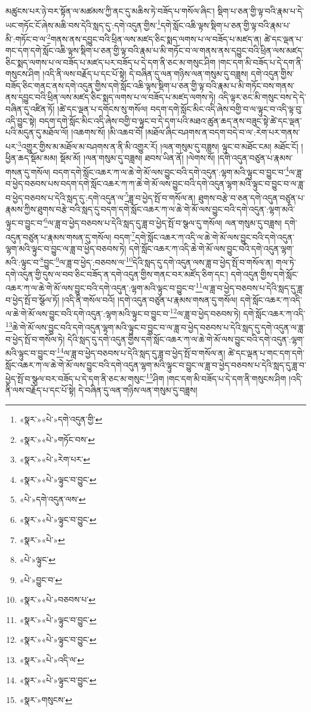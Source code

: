 མཚུངས་པར་ཉེ་བར་སྟོན་ལ་མཚམས་ཀྱི་ནང་དུ་མཆིས་ཏེ་བཟོད་པ་གསོལ་ཞིང་། སྡིག་པ་ཅན་གྱི་ལྟ་བའི་རྣམ་པ་དེ་ཡང་གཏོང་ངོ་ཞེས་མཆི་བས་དེའི་སླད་དུ་:དགེ་འདུན་གྱིས་\footnote{«སྣར་»«པེ་»དགེ་འདུན་གྱི་}དགེ་སློང་འཆི་ལྟས་སྡིག་པ་ཅན་གྱི་ལྟ་བའི་རྣམ་པ་མི་:གཏོང་བ་ལ་\footnote{«སྣར་»«པེ་»གཏོང་བས་}གནས་ནས་དབྱུང་བའི་ཕྲིན་ལས་མཛད་ཅིང་སྨད་ལགས་པ་ལ་བཟོད་པ་མཛད་ན། ཚེ་དང་ལྡན་པ་གང་དག་དགེ་སློང་འཆི་ལྟས་སྡིག་པ་ཅན་གྱི་ལྟ་བའི་རྣམ་པ་མི་གཏོང་བ་ལ་གནས་ནས་དབྱུང་བའི་ཕྲིན་ལས་མཛད་ཅིང་སྨད་ལགས་པ་ལ་བཟོད་པ་མཛད་པར་བཟོད་པ་དེ་དག་ནི་ཅང་མ་གསུང་ཤིག །གང་དག་མི་བཟོད་པ་དེ་དག་ནི་གསུངས་ཤིག །འདི་ནི་ལས་བརྗོད་པ་དང་པོ་སྟེ། དེ་བཞིན་དུ་ལན་གཉིས་ལན་གསུམ་དུ་བཟླས། དགེ་འདུན་གྱིས་བཟོད་ཅིང་གནང་ནས་དགེ་འདུན་གྱིས་དགེ་སློང་འཆི་ལྟས་སྡིག་པ་ཅན་གྱི་ལྟ་བའི་རྣམ་པ་མི་གཏོང་བས་གནས་ནས་དབྱུང་བའི་ཕྲིན་ལས་མཛད་ཅིང་སྨད་ལགས་པ་ལ་བཟོད་པ་མཛད་ལགས་ཏེ། འདི་ལྟར་ཅང་མི་གསུང་བས་དེ་དེ་བཞིན་དུ་འཛིན་ཏོ། །ཚེ་དང་ལྡན་པ་དགོངས་སུ་གསོལ། བདག་དགེ་སློང་མིང་འདི་ཞེས་བགྱི་བ་ལ་ལྟུང་བ་འདི་ལྟ་བུ་འདི་བྱུང་སྟེ། བདག་དགེ་སློང་མིང་འདི་ཞེས་བགྱི་བ་ལྟུང་བ་དེ་དག་པའི་མཐའ་ཚུན་ཆད་ནས་བཟུང་སྟེ་ཚེ་དང་ལྡན་པའི་མདུན་དུ་མཐོལ་ལོ། །འཆགས་སོ། །མི་འཆབ་བོ། །མཐོལ་ཞིང་བཤགས་ན་བདག་བདེ་བ་ལ་:རེག་པར་གནས་པར་\footnote{«སྣར་»«པེ་»རེག་པར་}འགྱུར་གྱིས་མ་མཐོལ་མ་བཤགས་ན་ནི་མི་འགྱུར་རོ། །ལན་གསུམ་དུ་བཟླས། ལྟུང་བ་མཐོང་ངམ། མཐོང་ངོ། །ཕྱིན་ཆད་སྡོམ་མམ། སྡོམ་མོ། །ལན་གསུམ་དུ་བཟླས། ཐབས་ཡིན་ནོ། །ལེགས་སོ། །དགེ་འདུན་བཙུན་པ་རྣམས་གསན་དུ་གསོལ། བདག་དགེ་སློང་འཆར་ཀ་ལ་ཆེ་གེ་མོ་ལས་བྱུང་བའི་དགེ་འདུན་:ལྷག་མའི་ལྟུང་བ་བྱུང་བ་\footnote{«སྣར་»«པེ་»ལྟུང་བ་བྱུང་}ལ་ཟླ་བ་ཕྱེད་བཅབས་པས་བདག་དགེ་སློང་འཆར་ཀ་ཀ་ཆེ་གེ་མོ་ལས་བྱུང་བའི་དགེ་འདུན་ལྷག་མའི་ལྟུང་བ་བྱུང་བ་ལ་ཟླ་བ་ཕྱེད་བཅབས་པ་དེའི་སླད་དུ་:དགེ་འདུན་ལ་\footnote{«པེ་»དགེ་འདུན་ལས་}ཟླ་བ་ཕྱེད་སྤོ་བ་གསོལ་ན། ཐུགས་བརྩེ་བ་ཅན་དགེ་འདུན་བཙུན་པ་རྣམས་ཀྱིས་ཐུགས་བརྩེ་བའི་སླད་དུ་བདག་དགེ་སློང་འཆར་ཀ་ལ་ཆེ་གེ་མོ་ལས་བྱུང་བའི་དགེ་འདུན་:ལྷག་མའི་ལྟུང་བ་བྱུང་བ་\footnote{«སྣར་»«པེ་»ལྟུང་བ་བྱུང་}ལ་ཟླ་བ་ཕྱེད་བཅབས་པ་དེའི་སླད་དུ་ཟླ་བ་ཕྱེད་སྤོ་བ་སྩལ་དུ་གསོལ། ལན་གསུམ་དུ་བཟླས། དགེ་འདུན་བཙུན་པ་རྣམས་གསན་དུ་གསོལ། བདག་\footnote{«སྣར་»«པེ་»}དགེ་སློང་འཆར་ཀ་འདི་ལ་ཆེ་གེ་མོ་ལས་བྱུང་བའི་དགེ་འདུན་ལྷག་མའི་ལྟུང་བ་བྱུང་ལ་ཟླ་བ་ཕྱེད་བཅབས་ཏེ། དགེ་སློང་འཆར་ཀ་འདི་ཆེ་གེ་མོ་ལས་བྱུང་བའི་དགེ་འདུན་ལྷག་མའི་:ལྟུང་བ་\footnote{«པེ་»ལྟུང་}བྱུང་\footnote{«པེ་»བྱུང་བ་}ལ་ཟླ་བ་ཕྱེད་:བཅབས་ལ་\footnote{«སྣར་»«པེ་»བཅབས་པ་}དེའི་སླད་དུ་དགེ་འདུན་ལས་ཟླ་བ་ཕྱེད་སྤོ་བ་གསོལ་ན། གལ་ཏེ་དགེ་འདུན་གྱི་དུས་ལ་བབ་ཅིང་བཟོད་ན་དགེ་འདུན་གྱིས་གནང་བར་མཛོད་ཅིག་དང་། དགེ་འདུན་གྱིས་དགེ་སློང་འཆར་ཀ་ལ་ཆེ་གེ་མོ་ལས་བྱུང་བའི་དགེ་འདུན་:ལྷག་མའི་ལྟུང་བ་བྱུང་བ་\footnote{«སྣར་»«པེ་»ལྟུང་བ་བྱུང་}ལ་ཟླ་བ་ཕྱེད་བཅབས་པ་དེའི་སླད་དུ་ཟླ་བ་ཕྱེད་སྤོ་བ་སྩོལ་ཏོ། །འདི་ནི་གསོལ་བའོ། །དགེ་འདུན་བཙུན་པ་རྣམས་གསན་དུ་གསོལ། དགེ་སློང་འཆར་ཀ་འདི་ལ་ཆེ་གེ་མོ་ལས་བྱུང་བའི་དགེ་འདུན་:ལྷག་མའི་ལྟུང་བ་བྱུང་བ་\footnote{«སྣར་»«པེ་»ལྟུང་བ་བྱུང་}ལ་ཟླ་བ་ཕྱེད་བཅབས་ཏེ། དགེ་སློང་འཆར་ཀ་འདི་\footnote{«སྣར་»«པེ་»འདི་ལ་}ཆེ་གེ་མོ་ལས་བྱུང་བའི་དགེ་འདུན་ལྷག་མའི་ལྟུང་བ་བྱུང་བ་ལ་ཟླ་བ་ཕྱེད་བཅབས་པ་དེའི་སླད་དུ་དགེ་འདུན་ལ་ཟླ་བ་ཕྱེད་སྤོ་བ་གསོལ་ཏེ། དེའི་སླད་དུ་དགེ་འདུན་གྱིས་དགེ་སློང་འཆར་ཀ་ལ་ཆེ་གེ་མོ་ལས་བྱུང་བའི་དགེ་འདུན་:ལྷག་མའི་ལྟུང་བ་བྱུང་བ་\footnote{«སྣར་»«པེ་»ལྟུང་བ་བྱུང་}ལ་ཟླ་བ་ཕྱེད་བཅབས་པ་དེའི་སླད་དུ་ཟླ་བ་ཕྱེད་སྤོ་བ་གསོལ་ན། ཚེ་དང་ལྡན་པ་གང་དག་དགེ་སློང་འཆར་ཀ་ལ་ཆེ་གེ་མོ་ལས་བྱུང་བའི་དགེ་འདུན་ལྷག་མའི་ལྟུང་བ་བྱུང་ལ་ཟླ་བ་ཕྱེད་བཅབས་པ་དེའི་སླད་དུ་ཟླ་བ་ཕྱེད་སྤོ་བ་སྩལ་བར་བཟོད་པ་དེ་དག་ནི་ཅང་མ་གསུང་\footnote{«སྣར་»གསུངས་}ཤིག །གང་དག་མི་བཟོད་པ་དེ་དག་ནི་གསུངས་ཤིག །འདི་ནི་ལས་བརྗོད་པ་དང་པོ་སྟེ། དེ་བཞིན་དུ་ལན་གཉིས་ལན་གསུམ་དུ་བཟླས། 